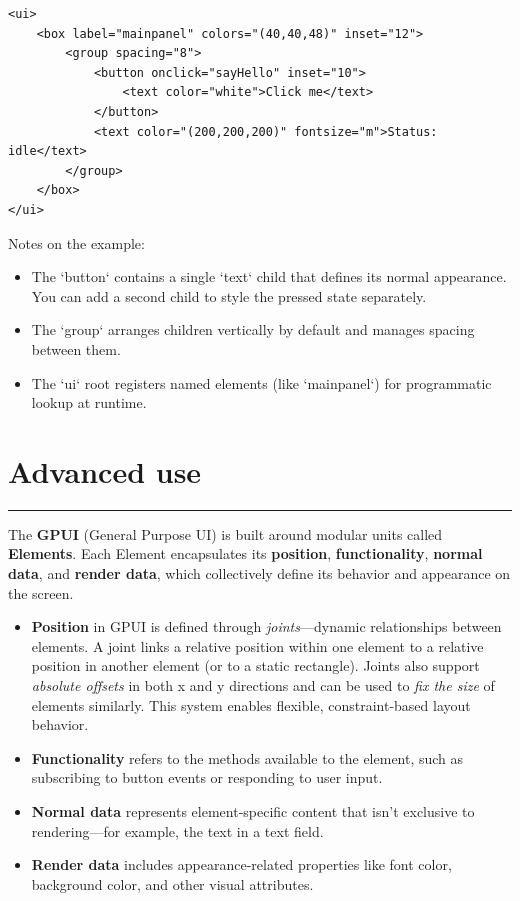 \documentclass[a4paper,11pt]{article}
\begin{document}
\begin{verbatim}
<ui>
    <box label="mainpanel" colors="(40,40,48)" inset="12">
        <group spacing="8">
            <button onclick="sayHello" inset="10">
                <text color="white">Click me</text>
            </button>
            <text color="(200,200,200)" fontsize="m">Status: idle</text>
        </group>
    </box>
</ui>
\end{verbatim}

Notes on the example:
\begin{itemize}
    \item The `button` contains a single `text` child that defines its normal appearance. You can add a second child to style the pressed state separately.
    \item The `group` arranges children vertically by default and manages spacing between them.
    \item The `ui` root registers named elements (like `mainpanel`) for programmatic lookup at runtime.
\end{itemize}




\section*{Advanced use}
\vspace{-1.2em}
\rule{\linewidth}{0.4pt}
The \textbf{GPUI} (General Purpose UI) is built around modular units called \textbf{Elements}.  
Each Element encapsulates its \textbf{position}, \textbf{functionality}, \textbf{normal data}, and \textbf{render data}, which collectively define its behavior and appearance on the screen.

\begin{itemize}
    \item \textbf{Position} in GPUI is defined through \textit{joints}—dynamic relationships between elements. A joint links a relative position within one element to a relative position in another element (or to a static rectangle). Joints also support \textit{absolute offsets} in both x and y directions and can be used to \textit{fix the size} of elements similarly. This system enables flexible, constraint-based layout behavior.

    \item \textbf{Functionality} refers to the methods available to the element, such as subscribing to button events or responding to user input.

    \item \textbf{Normal data} represents element-specific content that isn’t exclusive to rendering—for example, the text in a text field.

    \item \textbf{Render data} includes appearance-related properties like font color, background color, and other visual attributes.
\end{itemize}
\end{document}
